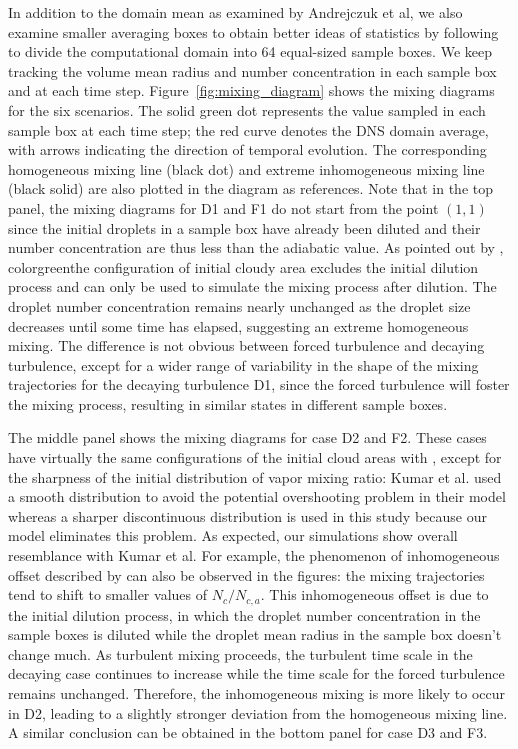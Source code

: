 \documentclass[draft,linenumbers]{agujournal}
\newcommand{\Fig}[1]{Figure~\ref{#1}}
\begin{document}
In addition to the domain mean as examined by Andrejczuk et al, we also examine smaller averaging boxes to obtain better ideas of statistics by following \citet{Kumar14} to divide the computational domain into 64 equal-sized sample boxes. We keep tracking the volume mean radius and number concentration in each sample box and at each time step. \Fig{fig:mixing_diagram} shows the mixing diagrams for the six scenarios. The solid green dot represents the value sampled in each sample box at each time step; the red curve denotes the DNS domain average, with arrows indicating the direction of temporal evolution. The corresponding homogeneous mixing line (black dot) and extreme inhomogeneous mixing line (black solid) are also plotted in the diagram as references. Note that in the top panel, the mixing diagrams for D1 and F1 do not start from the point $(1,1)$ since the initial droplets in a sample box have already been diluted and their number concentration are thus less than the adiabatic value. As pointed out by \citet{And04}, {color{green}the configuration of initial cloudy area} excludes the initial dilution process and can only be used to simulate the mixing process after dilution. The droplet number concentration remains nearly unchanged as the droplet size decreases until some time has elapsed, suggesting an extreme homogeneous mixing. The difference is not obvious between forced turbulence and decaying turbulence, except for a wider range of variability in the shape of the mixing trajectories for the decaying turbulence D1, since the forced turbulence will foster the mixing process, resulting in similar states in different sample boxes. 

The middle panel shows the mixing diagrams for case D2 and F2. These cases have virtually the same configurations {\color{green}of the initial cloud areas} with \citet{Kumar14}, except {\color{green} for the sharpness of the initial distribution of vapor mixing ratio: Kumar et al. used a smooth distribution to avoid the potential overshooting problem in their model whereas a sharper discontinuous distribution is used in this study because our model eliminates this problem. As expected, our simulations show overall resemblance with Kumar et al. For example,} the phenomenon of inhomogeneous offset described by \citet{Kumar14} can also be observed in the figures: the mixing trajectories tend to shift to smaller values of $N_c/N_{c,a}$. This inhomogeneous offset is due to the initial dilution process, in which the droplet number concentration in the sample boxes is diluted while the droplet mean radius in the sample box doesn't change much. As turbulent mixing proceeds, the turbulent time scale in the decaying case continues to increase while the time scale for the forced turbulence remains unchanged. Therefore, the inhomogeneous mixing is more likely to occur in D2, leading to a slightly stronger deviation from the homogeneous mixing line.  A similar conclusion can be obtained in the bottom panel for case D3 and F3. 
\end{document}
